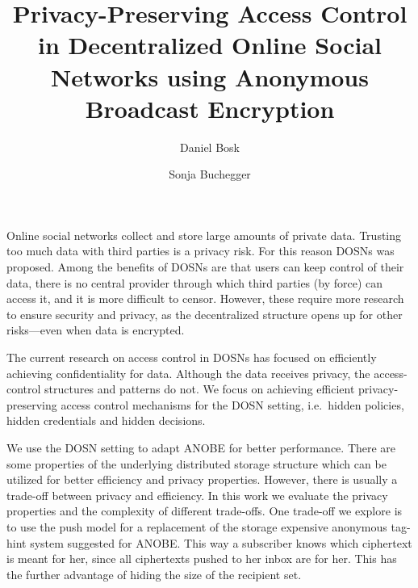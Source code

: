 \title{%
  Privacy-Preserving Access Control in
  Decentralized Online Social Networks using
  Anonymous Broadcast Encryption
}
\author{%
  Daniel Bosk \and
  Sonja Buchegger
}

\maketitle

Online social networks collect and store large amounts of private data.
Trusting too much data with third parties is a privacy risk.
For this reason \acp{DOSN} was proposed.
Among the benefits of \acp{DOSN} are that users can keep control of their data, 
there is no central provider through which third parties (by force) can access 
it, and it is more difficult to censor.
However, these require more research to ensure security and privacy, as the 
decentralized structure opens up for other risks---even when data is encrypted.

The current research on access control in \acp{DOSN} has focused on 
efficiently achieving confidentiality for data.
Although the data receives privacy, the access-control structures and patterns 
do not.
We focus on achieving efficient privacy-preserving access control mechanisms 
for the \ac{DOSN} setting, i.e.~hidden policies, hidden credentials and 
hidden decisions.

We use the \ac{DOSN} setting to adapt \acl{ANOBE} for better performance.
There are some properties of the underlying distributed storage structure which 
can be utilized for better efficiency and privacy properties.
However, there is usually a trade-off between privacy and efficiency.
In this work we evaluate the privacy properties and the complexity of different 
trade-offs.
One trade-off we explore is to use the push model for a replacement of the 
storage expensive anonymous tag-hint system suggested for \acl{ANOBE}.
This way a subscriber knows which ciphertext is meant for her, since all 
ciphertexts pushed to her inbox are for her.
This has the further advantage of hiding the size of the recipient set.

